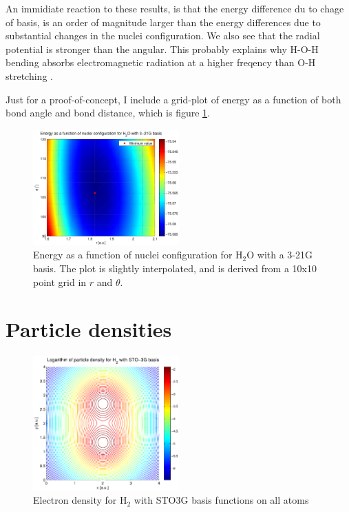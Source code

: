 \documentclass[a4paper,10pt, twocolumn, pre]{revtex4}
\begin{document}
An immidiate reaction to these results, is that the energy difference du to chage of basis, is an order of magnitude larger than the energy differences due to substantial changes in the nuclei configuration. We also see that the radial potential is stronger than the angular. This probably explains why H-O-H bending absorbs electromagnetic radiation at a higher freqency than O-H stretching \cite{Wikipedia}.

Just for a proof-of-concept, I include a grid-plot of energy as a function of both bond angle and bond distance, which is figure \ref{fig:configh2o}.

\begin{figure}
\includegraphics[width=0.5\textwidth]{figures/H2Oconfig_321g.pdf}
\caption{Energy as a function of nuclei configuration for H$_2$O with a 3-21G basis. The plot is slightly interpolated, and is derived from a 10x10 point grid in $r$ and $\theta$.}
\label{fig:configh2o}
\end{figure}


\section{Particle densities}

\begin{figure}[h!tb]
\includegraphics[width=0.5\textwidth]{./figures/H2density_sto3g.pdf}
\caption{Electron density for H$_2$ with STO3G basis functions on all atoms}
\end{figure}
\end{document}
